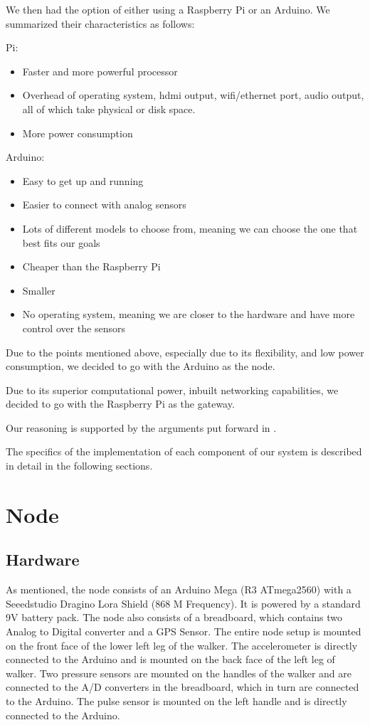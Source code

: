 		We then had the option of either using a Raspberry Pi or an Arduino. We summarized their characteristics as follows:

		Pi:
		\begin{itemize}
			\item Faster and more powerful processor
			\item Overhead of operating system, hdmi output, wifi/ethernet port, audio output, all of which take physical or disk space.
			\item More power consumption
		\end{itemize}

		Arduino:
		\begin{itemize}
			\item Easy to get up and running
			\item Easier to connect with analog sensors
			\item Lots of different models to choose from, meaning we can choose the one that best fits our goals
			\item Cheaper than the Raspberry Pi
			\item Smaller 
			\item No operating system, meaning we are closer to the hardware and have more control over the sensors
		\end{itemize}

		Due to the points mentioned above, especially due to its flexibility, and low power consumption, we decided to go with the Arduino as the node.

		Due to its superior computational power, inbuilt networking capabilities, we decided to go with the Raspberry Pi as the gateway.

		Our reasoning is supported by the arguments put forward in \cite{postolache2011smart}.





The specifics of the implementation of each component of our system is described in detail in the following sections.


\section{Node} 
	\subsection{Hardware}
		As mentioned, the node consists of an Arduino Mega (R3 ATmega2560) with a Seeedstudio Dragino Lora Shield (868 M Frequency). It is powered by a standard 9V battery pack. The node also consists of a breadboard, which contains two Analog to Digital converter and a GPS Sensor. The entire node setup is mounted on the front face of the lower left leg of the walker. The accelerometer is directly connected to the Arduino and is mounted on the back face of the left leg of walker. Two pressure sensors are mounted on the handles of the walker and are connected to the A/D converters in the breadboard, which in turn are connected to the Arduino. The pulse sensor is mounted on the left handle and is directly connected to the Arduino.

